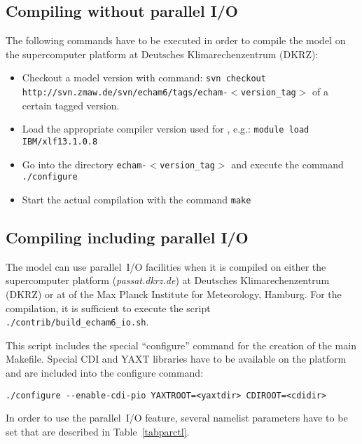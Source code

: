 \subsection{Compiling without parallel I/O}

The following commands have to be executed in order to compile the
\echam{} model on the supercomputer platform \blizzard{} at Deutsches
Klimarechenzentrum (DKRZ):

\begin{itemize}
\item Checkout a model version with command:\newline
{\tt svn checkout
  http://svn.zmaw.de/svn/echam6/tags/echam-$<$version\_tag$>$}\newline
of a certain tagged version.
\item Load the appropriate compiler version used for \echam, e.g.:\newline
{\tt module load IBM/xlf13.1.0.8}\newline
\item Go into the directory {\tt echam-$<$version\_tag$>$} and execute
  the command \newline
{\tt ./configure}
\item Start the actual compilation with the command\newline
  {\tt make}
\end{itemize}

\subsection{Compiling including parallel I/O}

The \echam{} model can use parallel~I/O facilities when it is compiled
on either the supercomputer platform \blizzard{}
({\it passat.dkrz.de}\/) at Deutsches 
Klimarechenzentrum (DKRZ) or at \thunder{} of the Max Planck
Institute for Meteorology, Hamburg.
For the compilation, it is sufficient to execute the script {\tt
  ./contrib/build\_echam6\_io.sh}.

This script includes the special ``configure'' command for the
creation of the main Makefile.
Special CDI and YAXT libraries have to be available on the platform
and are included into the configure command:
\begin{lstlisting}
./configure --enable-cdi-pio YAXTROOT=<yaxtdir> CDIROOT=<cdidir>
\end{lstlisting}
In order to use the parallel~I/O feature, several namelist parameters
have to be set that are described in Table~\ref{tabparctl}.


 
